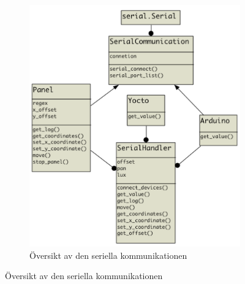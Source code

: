\begin{figure}[h]
\begin{subfigure}{0.49\textwidth}
        \includegraphics[width=\textwidth]{res/img/serial_uml}
        \caption{Översikt av den seriella kommunikationen}
    \end{subfigure}
\end{figure}
\vspace{20mm}
